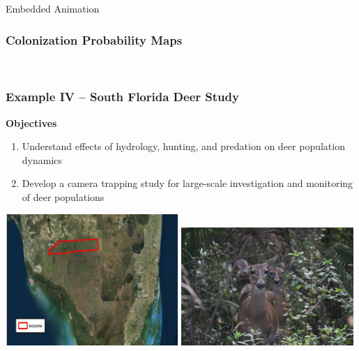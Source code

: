 \documentclass[color=usenames,dvipsnames]{beamer}
\begin{document}
\begin{frame}{Embedded Animation}
  \frametitle{Colonization Probability Maps}
  \centering
   \\
\end{frame}




\begin{frame}
  \frametitle{Example IV -- South Florida Deer Study}
  \large
  {\bf Objectives}
  \begin{enumerate}[\bf 1.]
    \item Understand effects of hydrology, hunting, and predation on
    deer population dynamics 
    \item<1-> Develop a camera trapping study for large-scale
    investigation and monitoring of deer populations
  \end{enumerate}
  \vfill
  \includegraphics[width=0.49\textwidth,trim = 0mm 8mm 0mm 0mm, clip]{figs/studyArea} \hfill
  \includegraphics[width=0.49\textwidth]{figs/deer2}
\end{frame}
\end{document}

